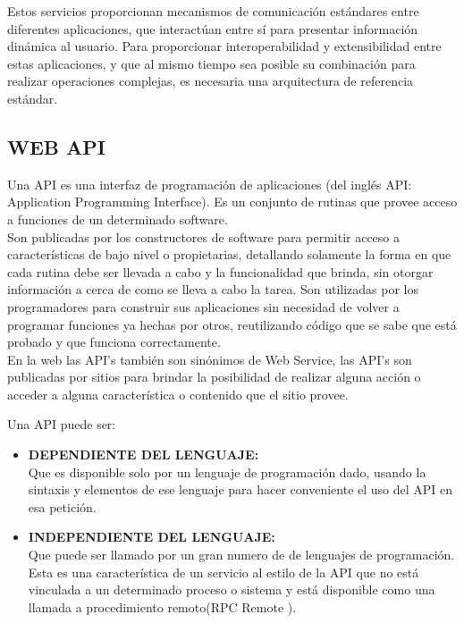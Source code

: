 Estos servicios proporcionan mecanismos de comunicación estándares entre diferentes aplicaciones, que interactúan entre sí para presentar información dinámica al usuario. Para proporcionar interoperabilidad y extensibilidad entre estas aplicaciones, y que al mismo tiempo sea posible su combinación para realizar operaciones complejas, es necesaria una arquitectura de referencia estándar.\\


\subsection{WEB API}
Una API es una interfaz de programación de aplicaciones (del inglés API: Application Programming Interface). Es un conjunto de rutinas que provee acceso a funciones de un determinado software.\\

Son publicadas por los constructores de software para permitir acceso a características de bajo nivel o propietarias, detallando solamente la forma en que cada rutina debe ser llevada a cabo y la funcionalidad que brinda, sin otorgar información a cerca de como se lleva a cabo la tarea. Son utilizadas por los programadores para construir sus aplicaciones sin necesidad de volver a programar funciones ya hechas por otros, reutilizando código que se sabe que está probado y que funciona correctamente.\\

En la web las API's también son sinónimos de Web Service, las API's son publicadas por sitios para brindar la posibilidad de realizar alguna acción o acceder a alguna característica o contenido que el sitio provee. 

Una API puede ser:

\begin{itemize}
 \item \textbf{DEPENDIENTE DEL LENGUAJE:}\\ Que es disponible solo por un lenguaje de programación dado, usando la sintaxis y elementos de ese lenguaje para hacer conveniente el uso del API en esa petición.
 \item \textbf{INDEPENDIENTE DEL LENGUAJE:}\\ Que puede ser llamado por un gran numero de de lenguajes de programación. Esta es una característica de un servicio al estilo de la API que no está vinculada a un determinado proceso o sistema y está disponible como una llamada a procedimiento remoto(RPC Remote ).
\end{itemize}

